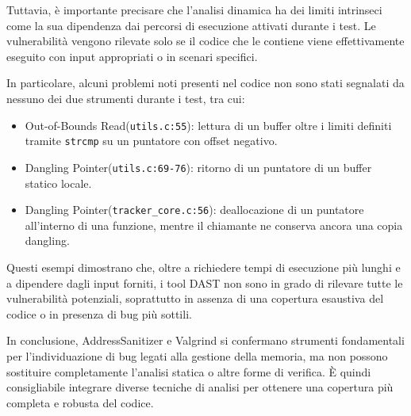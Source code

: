 Tuttavia, è importante precisare che l'analisi dinamica ha dei limiti intrinseci
come la sua dipendenza dai percorsi di esecuzione attivati durante i test. Le
vulnerabilità vengono rilevate solo se il codice che le contiene viene
effettivamente eseguito con input appropriati o in scenari specifici.

In particolare, alcuni problemi noti presenti nel codice non sono stati segnalati
da nessuno dei due strumenti durante i test, tra cui:
\begin{itemize}
  \item Out-of-Bounds Read(\texttt{utils.c:55}): lettura di un buffer oltre i
    limiti definiti tramite \texttt{strcmp} su un puntatore con offset negativo.

  \item Dangling Pointer(\texttt{utils.c:69-76}): ritorno di un puntatore di un
    buffer statico locale.

  \item Dangling Pointer(\texttt{tracker\_core.c:56}): deallocazione di un
    puntatore all'interno di una funzione, mentre il chiamante ne conserva ancora
    una copia dangling.
\end{itemize}

Questi esempi dimostrano che, oltre a richiedere tempi di esecuzione più lunghi e
a dipendere dagli input forniti, i tool DAST non sono in grado di rilevare tutte
le vulnerabilità potenziali, soprattutto in assenza di una copertura esaustiva del
codice o in presenza di bug più sottili.

In conclusione, AddressSanitizer e Valgrind si confermano strumenti fondamentali
per l'individuazione di bug legati alla gestione della memoria, ma non possono sostituire
completamente l'analisi statica o altre forme di verifica. È quindi
consigliabile integrare diverse tecniche di analisi per ottenere una copertura
più completa e robusta del codice.